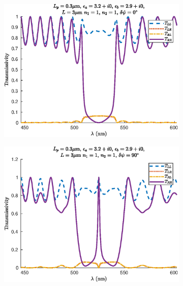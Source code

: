\begin{figure}
	\centering
	\begin{subfigure}{0.49\linewidth}
		\includegraphics[width=\linewidth]{plots/defect/no_defect/cwt_transmission}
		\caption{}
	\end{subfigure}
	\begin{subfigure}{0.49\linewidth}
		\includegraphics[width=\linewidth]{plots/defect/reflectivity/cwt_transmission}
		\caption{}
	\end{subfigure}
	\begin{subfigure}{0.49\linewidth}

\end{subfigure}
\end{figure}
